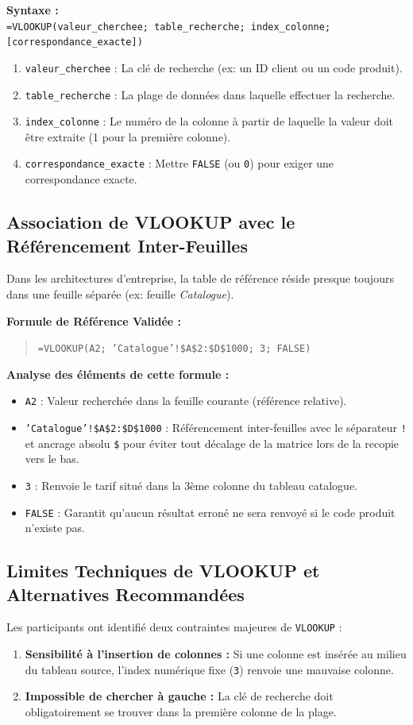 \documentclass[12pt,a4paper]{article}
\begin{document}
\textbf{Syntaxe :} \\
\texttt{=VLOOKUP(valeur\_cherchee; table\_recherche; index\_colonne; [correspondance\_exacte])}

\begin{enumerate}
    \item \texttt{valeur\_cherchee} : La clé de recherche (ex: un ID client ou un code produit).
    \item \texttt{table\_recherche} : La plage de données dans laquelle effectuer la recherche.
    \item \texttt{index\_colonne} : Le numéro de la colonne à partir de laquelle la valeur doit être extraite (1 pour la première colonne).
    \item \texttt{correspondance\_exacte} : Mettre \texttt{FALSE} (ou \texttt{0}) pour exiger une correspondance exacte.
\end{enumerate}

\subsection{Association de VLOOKUP avec le Référencement Inter-Feuilles}
Dans les architectures d'entreprise, la table de référence réside presque toujours dans une feuille séparée (ex: feuille \textit{Catalogue}).

\textbf{Formule de Référence Validée :}
\begin{quote}
\texttt{=VLOOKUP(A2; 'Catalogue'!\$A\$2:\$D\$1000; 3; FALSE)}
\end{quote}

\textbf{Analyse des éléments de cette formule :}
\begin{itemize}
    \item \texttt{A2} : Valeur recherchée dans la feuille courante (référence relative).
    \item \texttt{'Catalogue'!\$A\$2:\$D\$1000} : Référencement inter-feuilles avec le séparateur \texttt{!} et ancrage absolu \texttt{\$} pour éviter tout décalage de la matrice lors de la recopie vers le bas.
    \item \texttt{3} : Renvoie le tarif situé dans la 3ème colonne du tableau catalogue.
    \item \texttt{FALSE} : Garantit qu'aucun résultat erroné ne sera renvoyé si le code produit n'existe pas.
\end{itemize}

\subsection{Limites Techniques de VLOOKUP et Alternatives Recommandées}
Les participants ont identifié deux contraintes majeures de \texttt{VLOOKUP} :
\begin{enumerate}
    \item \textbf{Sensibilité à l'insertion de colonnes :} Si une colonne est insérée au milieu du tableau source, l'index numérique fixe (\texttt{3}) renvoie une mauvaise colonne.
    \item \textbf{Impossible de chercher à gauche :} La clé de recherche doit obligatoirement se trouver dans la première colonne de la plage.
\end{enumerate}
\end{document}
